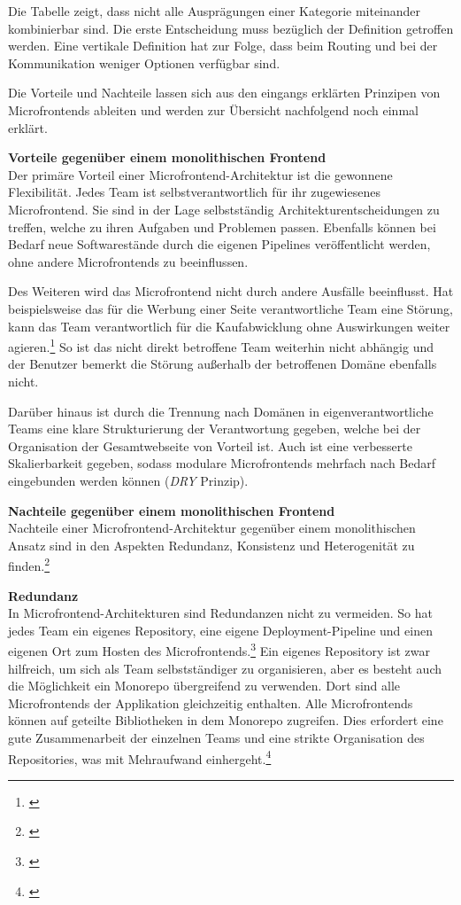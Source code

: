 Die Tabelle zeigt, dass nicht alle Ausprägungen einer Kategorie miteinander kombinierbar sind. Die erste Entscheidung muss bezüglich der Definition getroffen werden. Eine vertikale Definition hat zur Folge, dass beim Routing und bei der Kommunikation weniger Optionen verfügbar sind.

Die Vorteile und Nachteile lassen sich aus den eingangs erklärten Prinzipen von Microfrontends ableiten und werden zur Übersicht nachfolgend noch einmal erklärt.

\textbf{Vorteile gegenüber einem monolithischen Frontend}\\
Der primäre Vorteil einer Microfrontend-Architektur ist die gewonnene Flexibilität. Jedes Team ist selbstverantwortlich für ihr zugewiesenes Microfrontend. Sie sind in der Lage selbstständig Architekturentscheidungen zu treffen, welche zu ihren Aufgaben und Problemen passen. Ebenfalls können bei Bedarf neue Softwarestände durch die eigenen Pipelines veröffentlicht werden, ohne andere Microfrontends zu beeinflussen. 

Des Weiteren wird das Microfrontend nicht durch andere Ausfälle beeinflusst. Hat beispielsweise das für die Werbung einer Seite verantwortliche Team eine Störung, kann das Team verantwortlich für die Kaufabwicklung ohne Auswirkungen weiter agieren.\footnote{\cite[vgl.][19\psq]{Mezzalira2021}} So ist das nicht direkt betroffene Team weiterhin nicht abhängig und der Benutzer bemerkt die Störung außerhalb der betroffenen Domäne ebenfalls nicht.

Darüber hinaus ist durch die Trennung nach Domänen in eigenverantwortliche Teams eine klare Strukturierung der Verantwortung gegeben, welche bei der Organisation der Gesamtwebseite von Vorteil ist. Auch ist eine verbesserte Skalierbarkeit gegeben, sodass modulare Microfrontends mehrfach nach Bedarf eingebunden werden können (\textit{\gls{DRY}} Prinzip).

\textbf{Nachteile gegenüber einem monolithischen Frontend}\\
Nachteile einer Microfrontend-Architektur gegenüber einem monolithischen Ansatz sind in den Aspekten Redundanz, Konsistenz und Heterogenität zu finden.\footnote{\cite[vgl.][17]{Geers2020}}

\textbf{Redundanz}\\
In Microfrontend-Architekturen sind Redundanzen nicht zu vermeiden. So hat jedes Team ein eigenes Repository, eine eigene Deployment-Pipeline und einen eigenen Ort zum Hosten des Microfrontends.\footnote{\cite[vgl.][17\psq]{Geers2020}} Ein eigenes Repository ist zwar hilfreich, um sich als Team selbstständiger zu organisieren, aber es besteht auch die Möglichkeit ein Monorepo übergreifend zu verwenden. Dort sind alle Microfrontends der Applikation gleichzeitig enthalten. Alle Microfrontends können auf geteilte Bibliotheken in dem Monorepo zugreifen. Dies erfordert eine gute Zusammenarbeit der einzelnen Teams und eine strikte Organisation des Repositories, was mit Mehraufwand einhergeht.\footnote{\cite[vgl.][153\psq]{Mezzalira2021}}

